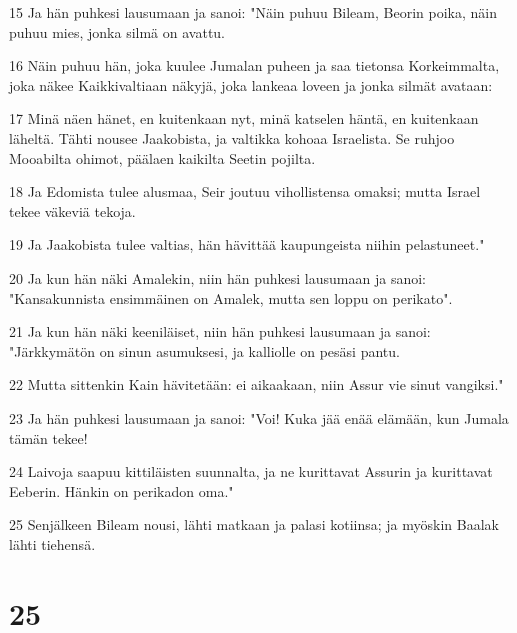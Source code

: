 \par 15 Ja hän puhkesi lausumaan ja sanoi: "Näin puhuu Bileam, Beorin poika, näin puhuu mies, jonka silmä on avattu.
\par 16 Näin puhuu hän, joka kuulee Jumalan puheen ja saa tietonsa Korkeimmalta, joka näkee Kaikkivaltiaan näkyjä, joka lankeaa loveen ja jonka silmät avataan:
\par 17 Minä näen hänet, en kuitenkaan nyt, minä katselen häntä, en kuitenkaan läheltä. Tähti nousee Jaakobista, ja valtikka kohoaa Israelista. Se ruhjoo Mooabilta ohimot, päälaen kaikilta Seetin pojilta.
\par 18 Ja Edomista tulee alusmaa, Seir joutuu vihollistensa omaksi; mutta Israel tekee väkeviä tekoja.
\par 19 Ja Jaakobista tulee valtias, hän hävittää kaupungeista niihin pelastuneet."
\par 20 Ja kun hän näki Amalekin, niin hän puhkesi lausumaan ja sanoi: "Kansakunnista ensimmäinen on Amalek, mutta sen loppu on perikato".
\par 21 Ja kun hän näki keeniläiset, niin hän puhkesi lausumaan ja sanoi: "Järkkymätön on sinun asumuksesi, ja kalliolle on pesäsi pantu.
\par 22 Mutta sittenkin Kain hävitetään: ei aikaakaan, niin Assur vie sinut vangiksi."
\par 23 Ja hän puhkesi lausumaan ja sanoi: "Voi! Kuka jää enää elämään, kun Jumala tämän tekee!
\par 24 Laivoja saapuu kittiläisten suunnalta, ja ne kurittavat Assurin ja kurittavat Eeberin. Hänkin on perikadon oma."
\par 25 Senjälkeen Bileam nousi, lähti matkaan ja palasi kotiinsa; ja myöskin Baalak lähti tiehensä.

\chapter{25}

